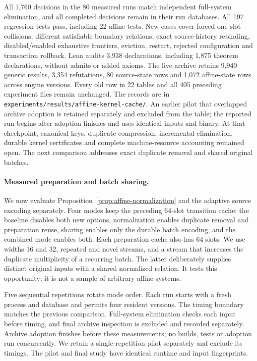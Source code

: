 \documentclass[11pt,a4paper]{article}
\numberwithin{equation}{section}
\theoremstyle{plain}
\theoremstyle{definition}
\theoremstyle{remark}
\begin{document}
All 1,760 decisions in the 80 measured runs match independent full-system elimination, and all completed decisions remain in their run databases. All 197 regression tests pass, including 22 affine tests. New cases cover forced one-slot collisions, different satisfiable boundary relations, exact source-history rebinding, disabled/enabled exhaustive frontiers, eviction, restart, rejected configuration and transaction rollback. Lean audits 3,938 declarations, including 1,875 theorem declarations, without admits or added axioms. The live archive retains 9,940 generic results, 3,354 refutations, 80 source-state rows and 1,072 affine-state rows across engine versions. Every old row in 22 tables and all 405 preceding experiment files remain unchanged. The records are in \texttt{experiments/results/affine-kernel-cache/}. An earlier pilot that overlapped archive adoption is retained separately and excluded from the table; the reported run begins after adoption finishes and uses identical inputs and binary. At that checkpoint, canonical keys, duplicate compression, incremental elimination, durable kernel certificates and complete machine-resource accounting remained open. The next comparison addresses exact duplicate removal and shared original batches.

\paragraph{Measured preparation and batch sharing.}
We now evaluate Proposition~\ref{prop:affine-normalization} and the adaptive source encoding separately. Four modes keep the preceding 64-slot transition cache: the baseline disables both new options, normalization enables duplicate removal and preparation reuse, sharing enables only the durable batch encoding, and the combined mode enables both. Each preparation cache also has 64 slots. We use widths 16 and 32, repeated and novel streams, and a stream that increases the duplicate multiplicity of a recurring batch. The latter deliberately supplies distinct original inputs with a shared normalized relation. It tests this opportunity; it is not a sample of arbitrary affine systems.

Five sequential repetitions rotate mode order. Each run starts with a fresh process and database and permits four resident versions. The timing boundary matches the previous comparison. Full-system elimination checks each input before timing, and final archive inspection is excluded and recorded separately. Archive adoption finishes before these measurements; no builds, tests or adoption run concurrently. We retain a single-repetition pilot separately and exclude its timings. The pilot and final study have identical runtime and input fingerprints.
\end{document}
